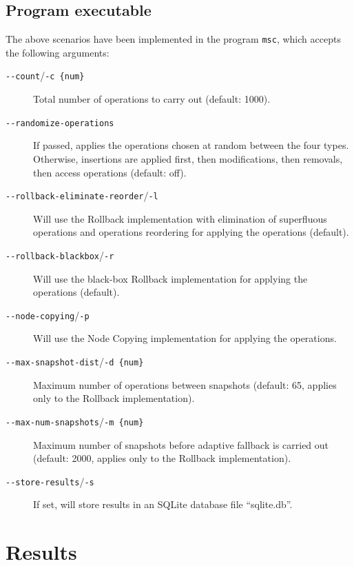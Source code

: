 \subsection{Program executable}

The above scenarios have been implemented in the program \texttt{msc}, which
accepts the following arguments:

\begin{description}

  \item[\texttt{-\@{}-count}/\texttt{-c \{num\}}] Total number of operations to carry
  out (default: 1000).

  \item[\texttt{-\@{}-randomize-operations}] If passed, applies the operations
  chosen at random between the four types. Otherwise, insertions are applied
  first, then modifications, then removals, then access operations (default:
  off).

  \item[\texttt{-\@{}-rollback-eliminate-reorder}/\texttt{-l}] Will use the Rollback
  implementation with elimination of superfluous operations and operations
  reordering for applying the operations (default).

  \item[\texttt{-\@{}-rollback-blackbox}/\texttt{-r}] Will use the black-box
  Rollback implementation for applying the operations (default).

  \item[\texttt{-\@{}-node-copying}/\texttt{-p}] Will use the Node
  Copying implementation for applying the operations.

  \item[\texttt{-\@{}-max-snapshot-dist}/\texttt{-d \{num\}}] Maximum number of
  operations between snapshots (default: 65, applies only to the Rollback
  implementation).

  \item[\texttt{-\@{}-max-num-snapshots}/\texttt{-m \{num\}}] Maximum number of
  snapshots before adaptive fallback is carried out (default: 2000, applies only to the Rollback
  implementation).

  \item[\texttt{-\@{}-store-results}/\texttt{-s}] If set, will store results in
  an SQLite database file ``sqlite.db''.

\end{description}

\section{Results}

